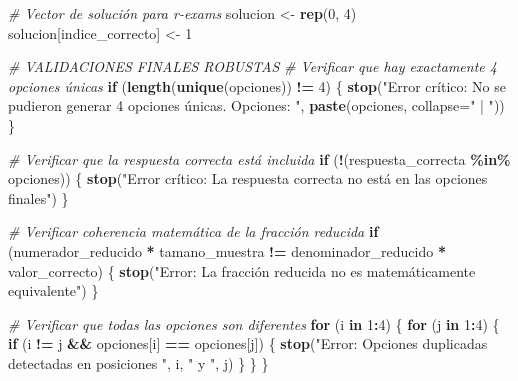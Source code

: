 \documentclass[
]{article}
\newenvironment{Shaded}{\begin{snugshade}}{\end{snugshade}}
\newcommand{\AttributeTok}[1]{\textcolor[rgb]{0.13,0.29,0.53}{#1}}
\newcommand{\CommentTok}[1]{\textcolor[rgb]{0.56,0.35,0.01}{\textit{#1}}}
\newcommand{\ControlFlowTok}[1]{\textcolor[rgb]{0.13,0.29,0.53}{\textbf{#1}}}
\newcommand{\DecValTok}[1]{\textcolor[rgb]{0.00,0.00,0.81}{#1}}
\newcommand{\FunctionTok}[1]{\textcolor[rgb]{0.13,0.29,0.53}{\textbf{#1}}}
\newcommand{\NormalTok}[1]{#1}
\newcommand{\OtherTok}[1]{\textcolor[rgb]{0.56,0.35,0.01}{#1}}
\newcommand{\SpecialCharTok}[1]{\textcolor[rgb]{0.81,0.36,0.00}{\textbf{#1}}}
\newcommand{\StringTok}[1]{\textcolor[rgb]{0.31,0.60,0.02}{#1}}
\begin{document}
\begin{Shaded}
\begin{Highlighting}[]
\CommentTok{\# Vector de solución para r{-}exams}
\NormalTok{solucion }\OtherTok{\textless{}{-}} \FunctionTok{rep}\NormalTok{(}\DecValTok{0}\NormalTok{, }\DecValTok{4}\NormalTok{)}
\NormalTok{solucion[indice\_correcto] }\OtherTok{\textless{}{-}} \DecValTok{1}

\CommentTok{\# VALIDACIONES FINALES ROBUSTAS}
\CommentTok{\# Verificar que hay exactamente 4 opciones únicas}
\ControlFlowTok{if}\NormalTok{ (}\FunctionTok{length}\NormalTok{(}\FunctionTok{unique}\NormalTok{(opciones)) }\SpecialCharTok{!=} \DecValTok{4}\NormalTok{) \{}
  \FunctionTok{stop}\NormalTok{(}\StringTok{"Error crítico: No se pudieron generar 4 opciones únicas. Opciones: "}\NormalTok{, }\FunctionTok{paste}\NormalTok{(opciones, }\AttributeTok{collapse=}\StringTok{" | "}\NormalTok{))}
\NormalTok{\}}

\CommentTok{\# Verificar que la respuesta correcta está incluida}
\ControlFlowTok{if}\NormalTok{ (}\SpecialCharTok{!}\NormalTok{(respuesta\_correcta }\SpecialCharTok{\%in\%}\NormalTok{ opciones)) \{}
  \FunctionTok{stop}\NormalTok{(}\StringTok{"Error crítico: La respuesta correcta no está en las opciones finales"}\NormalTok{)}
\NormalTok{\}}

\CommentTok{\# Verificar coherencia matemática de la fracción reducida}
\ControlFlowTok{if}\NormalTok{ (numerador\_reducido }\SpecialCharTok{*}\NormalTok{ tamano\_muestra }\SpecialCharTok{!=}\NormalTok{ denominador\_reducido }\SpecialCharTok{*}\NormalTok{ valor\_correcto) \{}
  \FunctionTok{stop}\NormalTok{(}\StringTok{"Error: La fracción reducida no es matemáticamente equivalente"}\NormalTok{)}
\NormalTok{\}}

\CommentTok{\# Verificar que todas las opciones son diferentes}
\ControlFlowTok{for}\NormalTok{ (i }\ControlFlowTok{in} \DecValTok{1}\SpecialCharTok{:}\DecValTok{4}\NormalTok{) \{}
  \ControlFlowTok{for}\NormalTok{ (j }\ControlFlowTok{in} \DecValTok{1}\SpecialCharTok{:}\DecValTok{4}\NormalTok{) \{}
    \ControlFlowTok{if}\NormalTok{ (i }\SpecialCharTok{!=}\NormalTok{ j }\SpecialCharTok{\&\&}\NormalTok{ opciones[i] }\SpecialCharTok{==}\NormalTok{ opciones[j]) \{}
      \FunctionTok{stop}\NormalTok{(}\StringTok{"Error: Opciones duplicadas detectadas en posiciones "}\NormalTok{, i, }\StringTok{" y "}\NormalTok{, j)}
\NormalTok{    \}}
\NormalTok{  \}}
\NormalTok{\}}


\end{Highlighting}
\end{Shaded}
\end{document}
